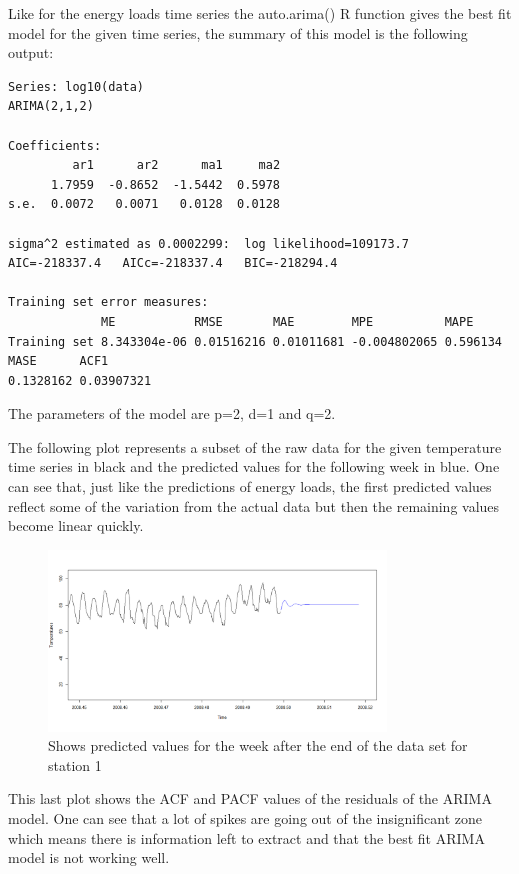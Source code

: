 \documentclass{article} %
\begin{document}
Like for the energy loads time series the auto.arima() R function gives the best fit model for the given time series, the summary of this model is the following output:

\begin{verbatim}
Series: log10(data) 
ARIMA(2,1,2)                    

Coefficients:
         ar1      ar2      ma1     ma2
      1.7959  -0.8652  -1.5442  0.5978
s.e.  0.0072   0.0071   0.0128  0.0128

sigma^2 estimated as 0.0002299:  log likelihood=109173.7
AIC=-218337.4   AICc=-218337.4   BIC=-218294.4

Training set error measures:
             ME           RMSE       MAE        MPE          MAPE
Training set 8.343304e-06 0.01516216 0.01011681 -0.004802065 0.596134
MASE      ACF1
0.1328162 0.03907321
\end{verbatim}

The parameters of the model are p=2, d=1 and q=2.

The following plot represents a subset of the raw data for the given temperature time series in black and the predicted values for the following week in blue. One can see that, just like the predictions of energy loads, the first predicted values reflect some of the variation from the actual data but then the remaining values become linear quickly.

\begin{figure}[H]
  \centering
    \includegraphics[width=0.80\textwidth]{TempPredictions}
  \caption{Shows predicted values for the week after the end of the data set for station 1 }
\end{figure}

This last plot shows the ACF and PACF values of the residuals of the ARIMA model. One can see that a lot of spikes are going out of the insignificant zone which means there is information left to extract and that the best fit ARIMA model is not working well.
\end{document}
